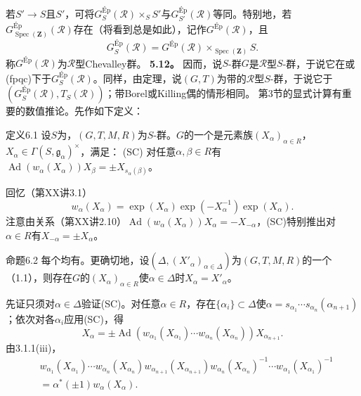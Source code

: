 若$S'\to S$且$S'$，可将$G_S^{\mathrm{Ép}}(\mathcal R)\times_S S'$与$G_{S'}^{\mathrm{Ép}}(\mathcal R)$等同。特别地，若$G_{\operatorname{Spec}(\mathbf Z)}^{\mathrm{Ép}}(\mathcal R)$存在（将看到总是如此），记作$G^{\mathrm{Ép}}(\mathcal R)$，且
\[G_S^{\mathrm{Ép}}(\mathcal R)=G^{\mathrm{Ép}}(\mathcal R)\times_{\operatorname{Spec}(\mathbf Z)}S.\]
称$G^{\mathrm{Ép}}(\mathcal R)$为$\mathcal R$型Chevalley群。
\textbf{5.12。} 因而，说$S$-群$G$是$\mathcal R$型$S$-群，于说它在或(fpqc)下于$G_S^{\mathrm{Ép}}(\mathcal R)$。同样，由定理，说$(G,T)$为带的$\mathcal R$型$S$-群，于说它于$(G_S^{\mathrm{Ép}}(\mathcal R),T_S(\mathcal R))$；带Borel或Killing偶的情形相同。
第3节的显式计算有重要的数值推论。先作如下定义：
\begin{SGAresult}{定义}{6.1}
设$S$为，$(G,T,M,R)$为$S$-群。$G$的一个是元素族$(X_\alpha)_{\alpha\in R}$，$X_\alpha\in\Gamma(S,\mathfrak g_\alpha)^\times$，满足：
(SC) 对任意$\alpha,\beta\in R$有$\operatorname{Ad}(w_\alpha(X_\alpha))X_\beta=\pm X_{s_\alpha(\beta)}$。
\end{SGAresult}
回忆（第XX讲3.1）
\[w_\alpha(X_\alpha)=\exp(X_\alpha)\exp(-X_\alpha^{-1})\exp(X_\alpha).\]
注意由关系（第XX讲2.10）$\operatorname{Ad}(w_\alpha(X_\alpha))X_\alpha=-X_{-\alpha}$，(SC)特别推出对$\alpha\in R$有$X_{-\alpha}=\pm X_\alpha$。
\begin{SGAresult}{命题}{6.2}
每个均有。更确切地，设$(\Delta,(X'_\alpha)_{\alpha\in\Delta})$为$(G,T,M,R)$的一个（1.1），则存在$G$的$(X_\alpha)_{\alpha\in R}$使$\alpha\in\Delta$时$X_\alpha=X'_\alpha$。
\end{SGAresult}
先证只须对$\alpha\in\Delta$验证(SC)。对任意$\alpha\in R$，存在$\{\alpha_i\}\subset\Delta$使$\alpha=s_{\alpha_1}\cdots s_{\alpha_n}(\alpha_{n+1})$；依次对各$\alpha_i$应用(SC)，得
\[X_\alpha=\pm\operatorname{Ad}(w_{\alpha_1}(X_{\alpha_1})\cdots w_{\alpha_n}(X_{\alpha_n}))X_{\alpha_{n+1}}.\]
由3.1.1(iii)，
\[\begin{aligned}{}&w_{\alpha_1}(X_{\alpha_1})\cdots w_{\alpha_n}(X_{\alpha_n})w_{\alpha_{n+1}}(X_{\alpha_{n+1}})w_{\alpha_n}(X_{\alpha_n})^{-1}\cdots w_{\alpha_1}(X_{\alpha_1})^{-1}\\{}&=\alpha^*(\pm1)w_\alpha(X_\alpha).\end{aligned}\]
